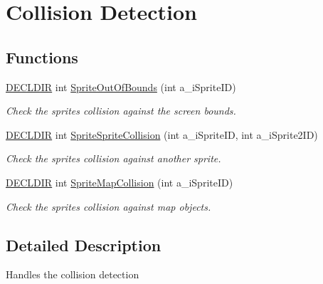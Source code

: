 \hypertarget{group___collisions}{\section{Collision Detection}
\label{group___collisions}
}
\subsection*{Functions}
\begin{DoxyCompactItemize}
\item 
\hyperlink{_framework_8h_a6b6635274dbcf57e29a0140cd8cf0305}{D\-E\-C\-L\-D\-I\-R} int \hyperlink{group___collisions_ga876a3200ff6e9382286ee9daa14a02bb}{Sprite\-Out\-Of\-Bounds} (int a\-\_\-i\-Sprite\-I\-D)
\begin{DoxyCompactList}\small\item\em Check the sprites collision against the screen bounds. \end{DoxyCompactList}\item 
\hyperlink{_framework_8h_a6b6635274dbcf57e29a0140cd8cf0305}{D\-E\-C\-L\-D\-I\-R} int \hyperlink{group___collisions_ga95b5ead6e7ccda693b3d165b9b9c33fb}{Sprite\-Sprite\-Collision} (int a\-\_\-i\-Sprite\-I\-D, int a\-\_\-i\-Sprite2\-I\-D)
\begin{DoxyCompactList}\small\item\em Check the sprites collision against another sprite. \end{DoxyCompactList}\item 
\hyperlink{_framework_8h_a6b6635274dbcf57e29a0140cd8cf0305}{D\-E\-C\-L\-D\-I\-R} int \hyperlink{group___collisions_ga3b18ff4362a799bbad94275c5879b7bf}{Sprite\-Map\-Collision} (int a\-\_\-i\-Sprite\-I\-D)
\begin{DoxyCompactList}\small\item\em Check the sprites collision against map objects. \end{DoxyCompactList}\end{DoxyCompactItemize}


\subsection{Detailed Description}
Handles the collision detection 

